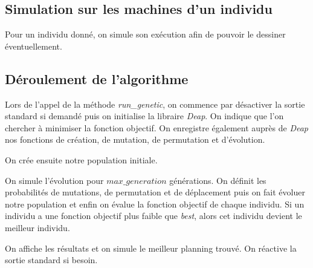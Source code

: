 \subsection{Simulation sur les machines d'un individu}



Pour un individu donné, on simule son exécution afin de pouvoir le dessiner éventuellement.

\newpage

\subsection{Déroulement de l'algorithme}



Lors de l'appel de la méthode \textit{run\_genetic}, on commence par désactiver la sortie standard si demandé puis on initialise la libraire \textit{Deap}. On indique que l'on chercher à minimiser la fonction objectif. On enregistre également auprès de \textit{Deap} nos fonctions de création, de mutation, de permutation et d'évolution.



On crée ensuite notre population initiale.



On simule l'évolution pour $max\_generation$ générations. On définit les probabilités de mutations, de permutation et de déplacement puis on fait évoluer notre population et enfin on évalue la fonction objectif de chaque individu. Si un individu a une fonction objectif plus faible que \textit{best}, alors cet individu devient le meilleur individu. 



On affiche les résultats et on simule le meilleur planning trouvé. On réactive la sortie standard si besoin.